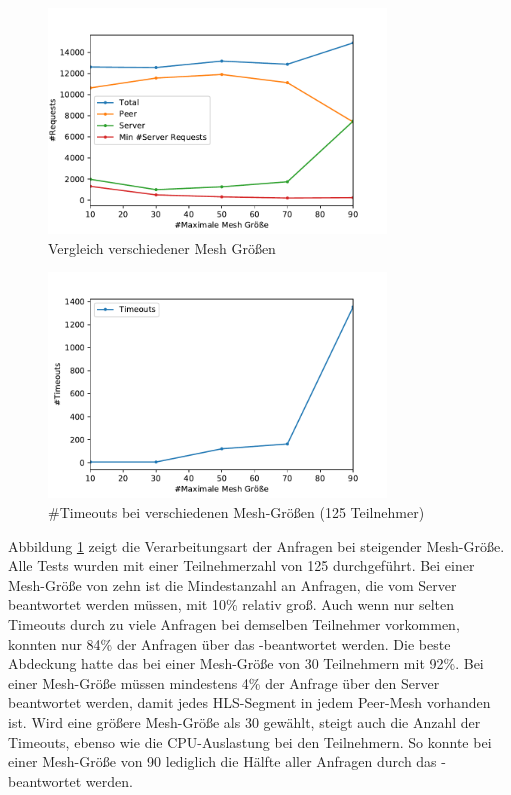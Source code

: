 
\begin{figure}[!h]
	\centering
	\includegraphics[width=0.8\textwidth]{figures/mesh_comparison}
	\caption[A Figure Short-Title]{Vergleich verschiedener Mesh Größen}
	\label{fig:mesh_comparison}
\end{figure}

\begin{figure}[!h]
	\centering
	\includegraphics[width=0.8\textwidth]{figures/timeouts_meshed}
	\caption[A Figure Short-Title]{#Timeouts bei verschiedenen Mesh-Größen (125 Teilnehmer)}
	\label{fig:timeouts_meshed}
\end{figure}

Abbildung \ref{fig:mesh_comparison} zeigt die Verarbeitungsart der Anfragen bei steigender Mesh-Größe. Alle Tests wurden mit einer Teilnehmerzahl von 125 durchgeführt. Bei einer Mesh-Größe von zehn ist die Mindestanzahl an Anfragen, die vom Server beantwortet werden müssen, mit 10\% relativ groß. Auch wenn nur selten Timeouts durch zu viele Anfragen bei demselben Teilnehmer vorkommen, konnten nur 84\% der Anfragen über das \pTp-\cdn beantwortet werden. Die beste Abdeckung hatte das \cdn bei einer Mesh-Größe von 30 Teilnehmern mit 92\%. Bei einer Mesh-Größe müssen mindestens 4\% der Anfrage über den Server beantwortet werden, damit jedes HLS-Segment in jedem Peer-Mesh vorhanden ist. Wird eine größere Mesh-Größe als 30 gewählt, steigt auch die Anzahl der Timeouts, ebenso wie die CPU-Auslastung bei den Teilnehmern. So konnte bei einer Mesh-Größe von 90 lediglich die Hälfte aller Anfragen durch das \pTp-\cdn beantwortet werden.


